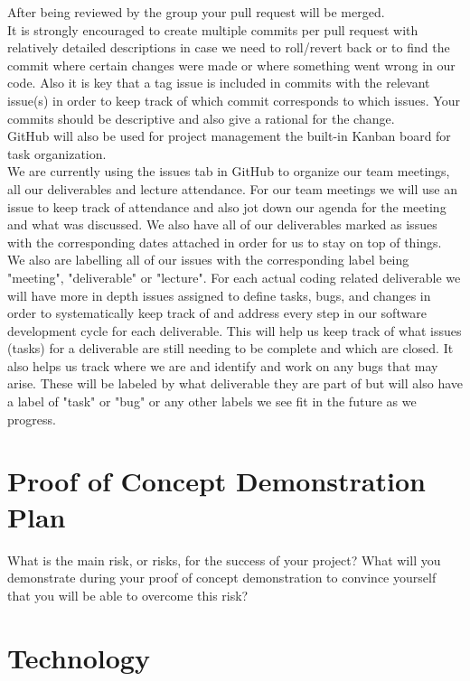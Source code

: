 \documentclass{article}
\begin{document}
After being reviewed by the group your pull request will be merged.\\

It is strongly encouraged to create multiple commits per pull request with relatively detailed descriptions in case we need to roll/revert back or to find the commit where certain changes were made or where something went wrong in our code. Also it is key that a tag issue is included in commits with the relevant issue(s) in order to keep track of which commit corresponds to which issues. Your commits should be descriptive and also give a rational for the change.\\

GitHub will also be used for project management  the built-in Kanban board for task organization. \\

We are currently using the issues tab in GitHub to organize our team meetings, all our deliverables and lecture attendance. For our team meetings we will use an issue to keep track of attendance and also jot down our agenda for the meeting and what was discussed. We also have all of our deliverables marked as issues with the corresponding dates attached in order for us to stay on top of things. We also are labelling all of our issues with the corresponding label being "meeting", "deliverable" or "lecture". For each actual coding related deliverable we will have more in depth issues assigned to define tasks, bugs, and changes in order to systematically keep track of and address every step in our software development cycle for each deliverable. This will help us keep track of what issues (tasks) for a deliverable are still needing to be complete and which are closed. It also helps us track where we are and identify and work on any bugs that may arise. These will be labeled by what deliverable they are part of but will also have a label of "task" or "bug" or any other labels we see fit in the future as we progress.

\section{Proof of Concept Demonstration Plan}

What is the main risk, or risks, for the success of your project?  What will you
demonstrate during your proof of concept demonstration to convince yourself that
you will be able to overcome this risk?

\section{Technology}
\end{document}
